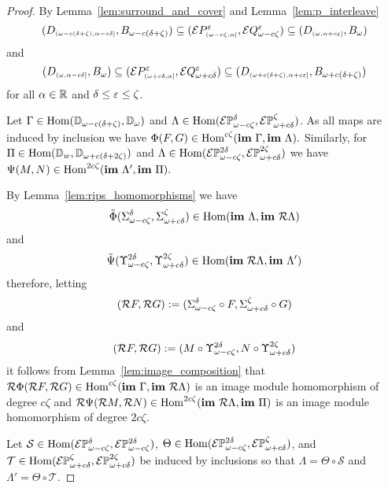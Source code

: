 \begin{proof}
  By Lemma~\ref{lem:surround_and_cover} and Lemma~\ref{lem:p_interleave}
  \[ (D_{\scriptscriptstyle (\omega-c(\delta+\zeta),\alpha-c\delta]},B_{\omega - c(\delta+\zeta)})\subseteq (\mathcal{E} P^\varepsilon_{\scriptscriptstyle (\omega-c\zeta,\alpha]},\mathcal{E} Q_{\omega - c\zeta}^\varepsilon)\subseteq (D_{\scriptscriptstyle (\omega,\alpha+c\varepsilon]},B_{\omega})\]
  and
  \[ (D_{\scriptscriptstyle (\omega,\alpha-c\delta]},B_{\omega})\subseteq (\mathcal{E} P^\varepsilon_{\scriptscriptstyle (\omega+c\delta,\alpha]},\mathcal{E} Q_{\omega + c{\delta}}^\varepsilon)\subseteq (D_{\scriptscriptstyle (\omega+c(\delta+\zeta),\alpha+c\varepsilon]},B_{\omega + c(\delta+\zeta)})\]
  for all $\alpha\in\mathbb{R}$ and $\delta\leq\varepsilon\leq\zeta$.

  Let $\Gamma\in\mathrm{Hom}(\mathbb{D}_{\omega-c(\delta+\zeta)},\mathbb{D}_{\omega})$ and $\Lambda\in\mathrm{Hom}(\mathcal{E} \mathbb{P}_{\omega-c\zeta}^{\delta},\mathcal{E} \mathbb{P}_{\omega+c\delta}^{\zeta})$.
  As all maps are induced by inclusion we have $\Phi(F, G)\in\mathrm{Hom}^{c\zeta}(\mathbf{im}~\Gamma, \mathbf{im}~\Lambda).$
  Similarly, for $\Pi\in\mathrm{Hom}(\mathbb{D}_{w},\mathbb{D}_{\omega+c(\delta+2\zeta)})$ and $\Lambda\in\mathrm{Hom}(\mathcal{E} \mathbb{P}_{\omega-c\zeta}^{2\delta},\mathcal{E} \mathbb{P}_{\omega+c\delta}^{2\zeta})$ we have $\Psi(M, N)\in\mathrm{Hom}^{2c\zeta}(\mathbf{im}~\Lambda',\mathbf{im}~\Pi).$

  By Lemma~\ref{lem:rips_homomorphisms} we have
  \[ \tilde{\Phi}(\Sigma_{\omega-c\zeta}^\delta,\Sigma_{\omega+c\delta}^\zeta)\in\mathrm{Hom}(\mathbf{im}~\Lambda,\mathbf{im}~\mathcal{R}\Lambda)\]
  and
  \[ \tilde{\Psi}(\Upsilon_{\omega-c\zeta}^{2\delta},\Upsilon_{\omega+c\delta}^{2\zeta})\in\mathrm{Hom}(\mathbf{im}~\mathcal{R}\Lambda,\mathbf{im}~\Lambda')\]
  therefore, letting
  \[ (\mathcal{R} F, \mathcal{R} G) := (\Sigma_{\omega-c\zeta}^\delta\circ F, \Sigma_{\omega+c\delta}^\zeta\circ G)\]
  and
  \[ (\mathcal{R} F, \mathcal{R} G) := (M\circ \Upsilon_{\omega-c\zeta}^{2\delta}, N\circ\Upsilon_{\omega+c\delta}^{2\zeta})\]
  it follows from Lemma~\ref{lem:image_composition} that $\mathcal{R} \Phi (\mathcal{R} F, \mathcal{R} G)\in\mathrm{Hom}^{c\zeta}(\mathbf{im}~\Gamma,\mathbf{im}~\mathcal{R}\Lambda)$ is an image module homomorphism of degree $c\zeta$ and $\mathcal{R}\Psi(\mathcal{R} M, \mathcal{R} N)\in\mathrm{Hom}^{2c\zeta}(\mathbf{im}~\mathcal{R}\Lambda,\mathbf{im}~\Pi)$ is an image module homomorphism of degree $2c\zeta$.


  Let $\mathcal{S}\in\mathrm{Hom}(\mathcal{E} \mathbb{P}_{\omega-c\zeta}^{\delta},\mathcal{E} \mathbb{P}_{\omega-c\zeta}^{2\delta})$, $\Theta\in\mathrm{Hom}(\mathcal{E} \mathbb{P}_{\omega-c\zeta}^{2\delta},\mathcal{E} \mathbb{P}_{\omega+c\delta}^{\zeta})$, and $\mathcal{T}\in\mathrm{Hom}(\mathcal{E} \mathbb{P}_{\omega+c\delta}^{\zeta},\mathcal{E} \mathbb{P}_{\omega+c\delta}^{2\zeta})$ be induced by inclusions so that $\Lambda = \Theta\circ \mathcal{S}$ and $\Lambda' = \Theta\circ \mathcal{T}$.


\end{proof}
